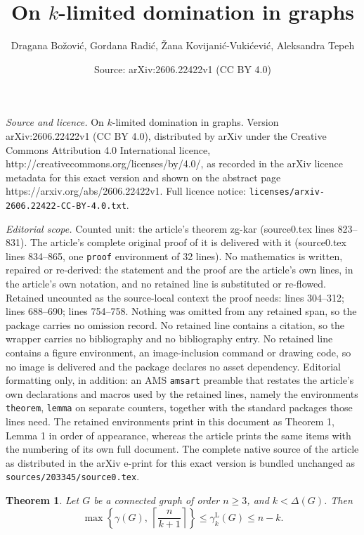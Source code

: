 \documentclass[10pt,a4paper]{amsart}
\title{On $k$-limited domination in graphs}
\author{Dragana Bo\v{z}ovi\'c, Gordana Radi\'c, \v{Z}ana Kovijani\'c-Vuki\'cevi\'c, Aleksandra Tepeh}
\date{Source: arXiv:2606.22422v1 (CC BY 4.0)}
\newtheorem{theorem}{Theorem}
\newcommand{\gammakL}{\gamma_k^{\mathrm L}}
\begin{document}
\maketitle

\noindent\emph{Source and licence.} On $k$-limited domination in graphs. Version arXiv:2606.22422v1 (CC BY 4.0), distributed by arXiv under the Creative Commons Attribution 4.0 International licence, http://creativecommons.org/licenses/by/4.0/, as recorded in the arXiv licence metadata for this exact version and shown on the abstract page https://arxiv.org/abs/2606.22422v1. Full licence notice: \texttt{licenses/arxiv-2606.22422-CC-BY-4.0.txt}.\par\smallskip

\noindent\textit{Editorial scope.} Counted unit: the article's theorem zg-kar (source0.tex lines 823--831). The article's complete original proof of it is delivered with it (source0.tex lines 834--865, one \texttt{proof} environment of 32 lines). No mathematics is written, repaired or re-derived: the statement and the proof are the article's own lines, in the article's own notation, and no retained line is substituted or re-flowed.  Retained uncounted as the source-local context the proof needs: lines 304--312; lines 688--690; lines 754--758.  Nothing was omitted from any retained span, so the package carries no omission record.  No retained line contains a citation, so the wrapper carries no bibliography and no bibliography entry.  No retained line contains a figure environment, an image-inclusion command or drawing code, so no image is delivered and the package declares no asset dependency.  Editorial formatting only, in addition: an AMS \texttt{amsart} preamble that restates the article's own declarations and macros used by the retained lines, namely the environments \texttt{theorem}, \texttt{lemma} on separate counters, together with the standard packages those lines need.  The retained environments print in this document as Theorem 1, Lemma 1 in order of appearance, whereas the article prints the same items with the numbering of its own full document.  The complete native source of the article as distributed in the arXiv e-print for this exact version is bundled unchanged as \texttt{sources/203345/source0.tex}.
\begin{theorem} 
\label{bounds}
Let $G$ be a connected graph of order $n\geq 3$, and $k < \Delta(G)$. Then
$$
\max\left\{\gamma(G),\ \left\lceil \frac{n}{k+1} \right\rceil\right\} 
\leq \gammakL(G)  \leq 
n-k.
$$
\end{theorem}
\end{document}
